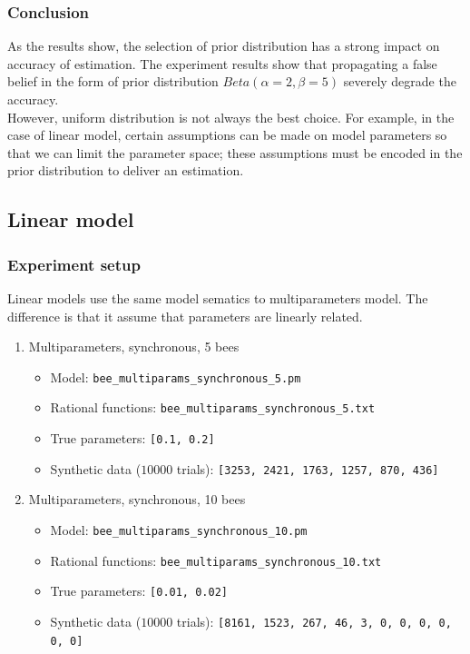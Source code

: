 \documentclass[12pt]{article}
\theoremstyle{definition}
\begin{document}
\subsubsection{Conclusion}
As the results show, the selection of prior distribution has a strong impact on
accuracy of estimation. The experiment results show that propagating a false
belief in the form of prior distribution $Beta(\alpha=2,\beta=5)$ severely
degrade the accuracy.\\
However, uniform distribution is not always the best choice. For example, in the
case of linear model, certain assumptions can be made on model parameters so that
we can limit the parameter space; these assumptions must be encoded in the prior
distribution to deliver an estimation.

\subsection{Linear model}
\subsubsection{Experiment setup}
Linear models use the same model sematics to multiparameters model. The
difference is that it assume that parameters are linearly related.
\begin{enumerate}
\item Multiparameters, synchronous, 5 bees
  \begin{itemize}
  \item Model: \texttt{bee\_multiparams\_synchronous\_5.pm}
  \item Rational functions: \texttt{bee\_multiparams\_synchronous\_5.txt}
  \item True parameters: \texttt{[0.1, 0.2]}
  \item Synthetic data ($10000$ trials): \texttt{[3253, 2421, 1763, 1257, 870, 436]}
  \end{itemize}
\item Multiparameters, synchronous, 10 bees
  \begin{itemize}
  \item Model: \texttt{bee\_multiparams\_synchronous\_10.pm}
  \item Rational functions: \texttt{bee\_multiparams\_synchronous\_10.txt}
  \item True parameters: \texttt{[0.01, 0.02]}
  \item Synthetic data ($10000$ trials): \texttt{[8161, 1523, 267, 46, 3, 0, 0, 0, 0, 0, 0]}
  \end{itemize}
\end{enumerate}
\end{document}
